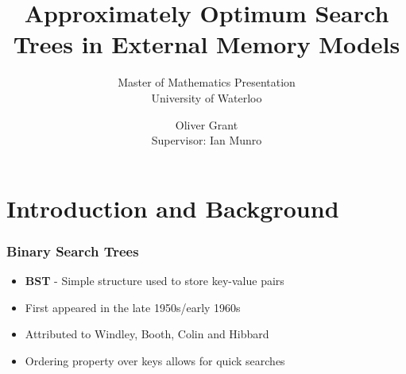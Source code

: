 \documentclass{beamer}
\title{Approximately Optimum Search
Trees in External Memory Models}
\subtitle{Master of Mathematics Presentation \\ University of Waterloo}
\author{Oliver Grant \\
Supervisor: Ian Munro}
\theoremstyle{plain}
\begin{document}
 \date{}
\begin{frame}
  \titlepage
\end{frame}


\section{Introduction and Background}

\begin{frame} \frametitle{Binary Search Trees}

\begin{itemize}

\item \textbf{BST} - Simple structure used to store key-value pairs

\item First appeared in the late 1950s/early 1960s

\item Attributed to Windley, Booth, Colin and Hibbard \cite{windley1960trees, booth1960efficiency, hibbard1962some}

\item Ordering property over keys allows for quick searches

\end{itemize}

\end{frame}
\end{document}
